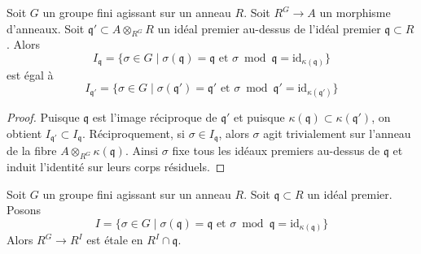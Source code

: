 \begin{lemma}
\label{lemma-inertia-base-change}
Soit $G$ un groupe fini agissant sur un anneau $R$. Soit $R^G \to A$ un morphisme
d'anneaux. Soit $\mathfrak q' \subset A \otimes_{R^G} R$ un idéal premier au-dessus
de l'idéal premier $\mathfrak q \subset R$. Alors
$$
I_\mathfrak q = \{\sigma \in G \mid
\sigma(\mathfrak q) = \mathfrak q\text{ et }
\sigma \bmod \mathfrak q = \text{id}_{\kappa(\mathfrak q)}\}
$$
est égal à
$$
I_{\mathfrak q'} = \{\sigma \in G \mid
\sigma(\mathfrak q') = \mathfrak q'\text{ et }
\sigma \bmod \mathfrak q' = \text{id}_{\kappa(\mathfrak q')}\}
$$
\end{lemma}

\begin{proof}
Puisque $\mathfrak q$ est l'image réciproque de $\mathfrak q'$
et puisque $\kappa(\mathfrak q) \subset \kappa(\mathfrak q')$,
on obtient $I_{\mathfrak q'} \subset I_\mathfrak q$.
Réciproquement, si $\sigma \in I_\mathfrak q$, alors $\sigma$
agit trivialement sur l'anneau de la fibre $A \otimes_{R^G} \kappa(\mathfrak q)$.
Ainsi $\sigma$ fixe tous les idéaux premiers au-dessus de $\mathfrak q$
et induit l'identité sur leurs corps résiduels.
\end{proof}

\begin{lemma}
\label{lemma-inertia-invariants-etale}
Soit $G$ un groupe fini agissant sur un anneau $R$. Soit $\mathfrak q \subset R$
un idéal premier. Posons
$$
I = \{\sigma \in G \mid \sigma(\mathfrak q) = \mathfrak q
\text{ et } \sigma \bmod \mathfrak q = \text{id}_{\kappa(\mathfrak q)}\}
$$
Alors $R^G \to R^I$ est étale en $R^I \cap \mathfrak q$.
\end{lemma}

